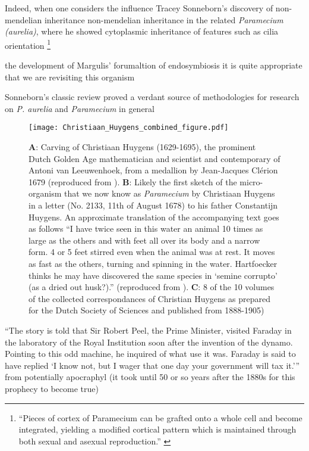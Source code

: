 \citep{Corliss1974} 





Indeed, when one considers the influence Tracey Sonneborn's discovery of non-mendelian
inheritance non-mendelian inheritance in the related \textit{Paramecium (aurelia)}, where he showed
cytoplasmic inheritance of features such as cilia orientation \footnote{``Pieces of cortex of Paramecium can be grafted onto a whole cell and
    become integrated, yielding a modified cortical pattern which is maintained through both sexual and asexual reproduction.'' \citep{Beisson1965}}

the development of Margulis' forumaltion of endosymbiosis \citep{Margulis1998} it is
quite appropriate that we are revisiting this organism

Sonneborn's classic review \citep{Sonneborn1950} proved a verdant source of methodologies
for research on  \textit{P. aurelia} and \textit{Paramecium} in general

\begin{figure}[h!]
    \caption{\textbf{A}: Carving of Christiaan Huygens (1629-1695), the prominent Dutch Golden Age mathematician and scientist and contemporary of Antoni van Leeuwenhoek, from a medallion by Jean-Jacques Cl\'erion 1679 (reproduced from \citep{Huygens}). \textbf{B}: Likely the first sketch of the micro-organism that we now know as \textit{Paramecium} by Christiaan Huygens in a letter (No. 2133, 11th of August 1678) to his father Constantijn Huygens. An approximate translation of the accompanying text goes as follows ``I have twice seen in this water an animal 10 times as large as the others and with feet all over its body and a narrow form. 4 or 5 feet stirred even when the animal was at rest. It moves as fast as the others, turning and spinning in the water. Hartfoecker thinks he may have discovered the same species in `semine corrupto' (as a dried out husk?).'' (reproduced from \citep{Huygens}). \textbf{C}: 8 of the 10 volumes of the collected correspondances of Christian Huygens as prepared for the Dutch Society of Sciences and published from 1888-1905)}
\texttt{[image: Christiaan\_Huygens\_combined\_figure.pdf]}
\end{figure}



``The story is told that Sir Robert Peel, the Prime Minister, visited Faraday in the laboratory of the Royal Institution soon after the invention of the dynamo.
Pointing to this odd machine, he inquired of what use it was. Faraday is said to have replied `I know not, but I wager that one day your government will tax it.'''
from \citep{PearceWilliams1965} potentially apocraphyl (it took until 50 or so years after the 1880s for this prophecy to become true)




